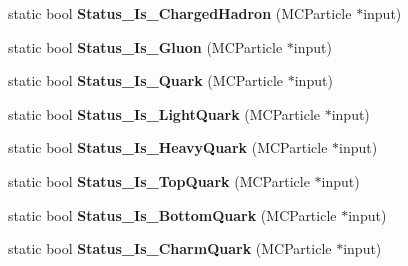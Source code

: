 \begin{DoxyCompactItemize}
\item 
\hypertarget{classToolSet_1_1CMC_a5df6b8b9f816ff8f89c3430ffbcb00ae}{
static bool {\bfseries Status\_\-Is\_\-ChargedHadron} (MCParticle $\ast$input)}
\label{classToolSet_1_1CMC_a5df6b8b9f816ff8f89c3430ffbcb00ae}

\item 
\hypertarget{classToolSet_1_1CMC_a30de4d54169d99c8119e789b4b01d59e}{
static bool {\bfseries Status\_\-Is\_\-Gluon} (MCParticle $\ast$input)}
\label{classToolSet_1_1CMC_a30de4d54169d99c8119e789b4b01d59e}

\item 
\hypertarget{classToolSet_1_1CMC_a86999adb3aa3b4d16de7b0819739b233}{
static bool {\bfseries Status\_\-Is\_\-Quark} (MCParticle $\ast$input)}
\label{classToolSet_1_1CMC_a86999adb3aa3b4d16de7b0819739b233}

\item 
\hypertarget{classToolSet_1_1CMC_ad5954c48a7cf4cb2ed2a139350266c61}{
static bool {\bfseries Status\_\-Is\_\-LightQuark} (MCParticle $\ast$input)}
\label{classToolSet_1_1CMC_ad5954c48a7cf4cb2ed2a139350266c61}

\item 
\hypertarget{classToolSet_1_1CMC_a0e32fa7bb651d3d471da504770ff39d3}{
static bool {\bfseries Status\_\-Is\_\-HeavyQuark} (MCParticle $\ast$input)}
\label{classToolSet_1_1CMC_a0e32fa7bb651d3d471da504770ff39d3}

\item 
\hypertarget{classToolSet_1_1CMC_a0f4beffb9924b6696075b59c1d8770c4}{
static bool {\bfseries Status\_\-Is\_\-TopQuark} (MCParticle $\ast$input)}
\label{classToolSet_1_1CMC_a0f4beffb9924b6696075b59c1d8770c4}

\item 
\hypertarget{classToolSet_1_1CMC_aa67cd425c28243078c8dfac594bdc71f}{
static bool {\bfseries Status\_\-Is\_\-BottomQuark} (MCParticle $\ast$input)}
\label{classToolSet_1_1CMC_aa67cd425c28243078c8dfac594bdc71f}

\item 
\hypertarget{classToolSet_1_1CMC_ab0b28b170ae3a6ee15ffa53138c75f58}{
static bool {\bfseries Status\_\-Is\_\-CharmQuark} (MCParticle $\ast$input)}
\label{classToolSet_1_1CMC_ab0b28b170ae3a6ee15ffa53138c75f58}


\end{DoxyCompactItemize}
